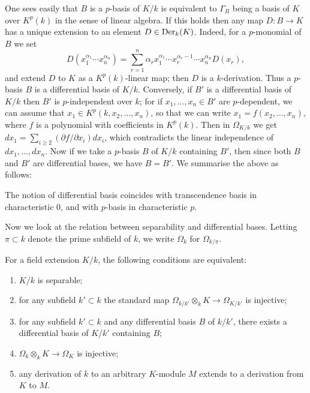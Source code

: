 One sees easily that $B$ is a $p$-basis of $K/k$ is equivalent to $\Gamma_B$ being a
basis of $K$ over $K^p(k)$ in the sense of linear algebra. If this holds then any map
$D\colon B \to K$ has a unique extension to an element $D \in \operatorname{Der}_k(K)$. Indeed, for a
$p$-monomial of $B$ we set
\[
  D(x_1^{\alpha_1} \cdots x_n^{\alpha_n}) = \sum_{r=1}^n \alpha_r x_1^{\alpha_1} \cdots
      x_r^{\alpha_r - 1} \cdots x_n^{\alpha_n}D(x_r),
\]
and extend $D$ to $K$ as a $K^p(k)$-linear map; then $D$ is a $k$-derivation. Thus a
$p$-basis $B$ is a differential basis of $K/k$. Conversely, if $B'$ is a differential
basis of $K/k$ then $B'$ is $p$-independent over $k$; for if $x_1, \ldots, x_n \in B'$ are
$p$-dependent, we can assume that $x_1 \in K^p(k, x_2, \ldots, x_n)$, so that we can
write $x_1 = f(x_2, \ldots, x_n)$, where $f$ is a polynomial with coefficients in $K^p(k)$.
Then in $\Omega_{K/k}$ we get $dx_1 = \sum_{i \ge 2}(\partial f/\partial x_i)dx_i$, which
contradicts the linear independence of $dx_1, \ldots, dx_n$. Now if we take a $p$-basis
$B$ of $K/k$ containing $B'$, then since both $B$ and $B'$ are differential bases, we
have $B = B'$. We summarise the above as follows:

\begin{theorem}\label{thm:26.5}
The notion of differential basis coincides with transcendence basis in
characteristic $0$, and with $p$-basis in characteristic $p$.
\end{theorem}

Now we look at the relation between separability and differential bases. Letting
$\pi \subset k$ denote the prime subfield of $k$, we write $\Omega_k$ for $\Omega_{k/\pi}$.

\begin{theorem}\label{thm:26.6}
For a field extension $K/k$, the following conditions are equivalent:
\begin{enumerate}[(1)]
  \item $K/k$ is separable;
  \item for any subfield $k' \subset k$ the standard map $\Omega_{k/k'} \otimes_k K \to \Omega_{K/k'}$
        is injective;
  \item[$2'$] for any subfield $k' \subset k$ and any differential basis $B$ of $k/k'$, there
        exists a differential basis of $K/k'$ containing $B$;
  \item $\Omega_k \otimes_k K \to \Omega_K$ is injective;
  \item any derivation of $k$ to an arbitrary $K$-module $M$ extends to a
        derivation from $K$ to $M$.
\end{enumerate}
\end{theorem}

